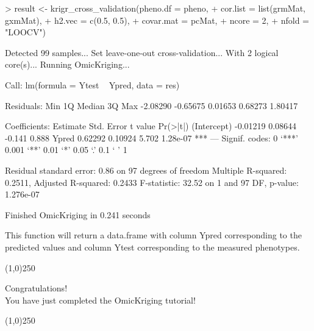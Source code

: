 \documentclass[a4paper]{article}
\begin{document}
\begin{Schunk}

\begin{Schunk}
\begin{Sinput}
> result <- krigr_cross_validation(pheno.df = pheno,
+ 	cor.list = list(grmMat, gxmMat),
+ 	h2.vec = c(0.5, 0.5),
+ 	covar.mat = pcMat,
+ 	ncore = 2,
+ 	nfold = "LOOCV")
\end{Sinput}
\begin{Soutput}
Detected 99 samples... 
Set leave-one-out cross-validation... 
With 2 logical core(s)... 
Running OmicKriging... 

Call:
lm(formula = Ytest ~ Ypred, data = res)

Residuals:
     Min       1Q   Median       3Q      Max 
-2.08290 -0.65675  0.01653  0.68273  1.80417 

Coefficients:
            Estimate Std. Error t value Pr(>|t|)    
(Intercept) -0.01219    0.08644  -0.141    0.888    
Ypred        0.62292    0.10924   5.702 1.28e-07 ***
---
Signif. codes:  0 ‘***’ 0.001 ‘**’ 0.01 ‘*’ 0.05 ‘.’ 0.1 ‘ ’ 1

Residual standard error: 0.86 on 97 degrees of freedom
Multiple R-squared:  0.2511,	Adjusted R-squared:  0.2433 
F-statistic: 32.52 on 1 and 97 DF,  p-value: 1.276e-07

Finished OmicKriging in 0.241 seconds 
\end{Soutput}
\end{Schunk}

\end{Schunk}
This function will return a data.frame with column Ypred corresponding to the predicted values and column Ytest corresponding to the measured phenotypes.
\begin{center}
\line(1,0){250}
\end{center}
\begin{center}
Congratulations! 
\\
You have just completed the OmicKriging tutorial!
\end{center}
\begin{center}
\line(1,0){250}
\end{center}
\end{document}
